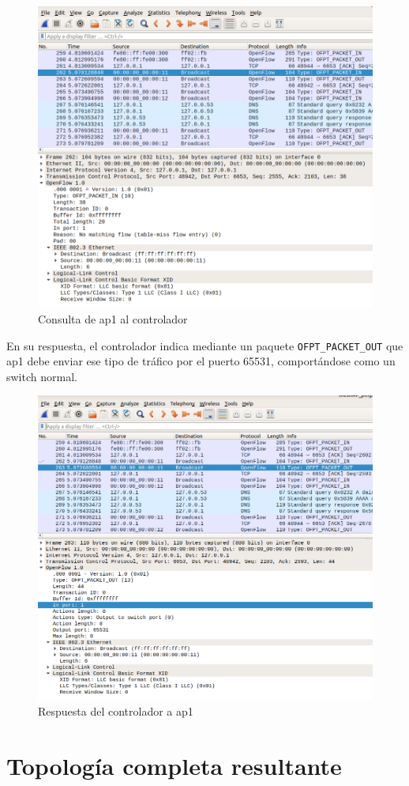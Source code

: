 \documentclass[a4paper,12pt,twoside,spanish]{book}
\begin{document}
	\begin{figure}[!h]
		\centering
		\includegraphics[scale=0.5]{Figuras/capt_1.png}
		\caption{Consulta de ap1 al controlador}
		\label{fig:capt_1}
	\end{figure}

En su respuesta, el controlador indica mediante un paquete \texttt{OFPT\_PACKET\_OUT} que ap1 debe enviar ese tipo de tráfico por el puerto 65531, comportándose como un switch normal.\par

	\begin{figure}[!h]
		\centering
		\includegraphics[scale=0.5]{Figuras/capt_2.png}
		\caption{Respuesta del controlador a ap1}
		\label{fig:capt_2}
	\end{figure}



\section{Topología completa resultante}
\end{document}
